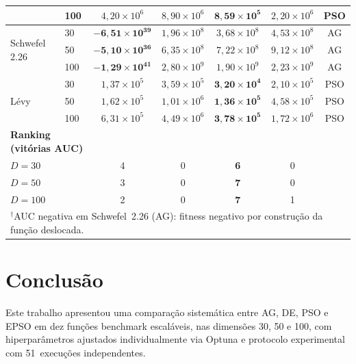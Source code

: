 \documentclass[runningheads]{llncs}
\begin{document}
\begin{table}[H]
\begin{tabular}{llccccc}
  & 100 & $4{,}20{\times}10^{6}$ & $8{,}90{\times}10^{6}$ & \cellcolor{green!20}$\mathbf{8{,}59{\times}10^{5}}$ & $2{,}20{\times}10^{6}$ & PSO \\
\midrule
\multirow{3}{*}{Schwefel 2.26}
  & 30  & \cellcolor{green!20}$\mathbf{-6{,}51{\times}10^{39}}$ & $1{,}96{\times}10^{8}$ & $3{,}68{\times}10^{8}$ & $4{,}53{\times}10^{8}$ & AG \\
  & 50  & \cellcolor{green!20}$\mathbf{-5{,}10{\times}10^{36}}$ & $6{,}35{\times}10^{8}$ & $7{,}22{\times}10^{8}$ & $9{,}12{\times}10^{8}$ & AG \\
  & 100 & \cellcolor{green!20}$\mathbf{-1{,}29{\times}10^{41}}$ & $2{,}80{\times}10^{9}$ & $1{,}90{\times}10^{9}$ & $2{,}23{\times}10^{9}$ & AG \\
\midrule
\multirow{3}{*}{Lévy}
  & 30  & $1{,}37{\times}10^{5}$ & $3{,}59{\times}10^{5}$ & \cellcolor{green!20}$\mathbf{3{,}20{\times}10^{4}}$ & $2{,}10{\times}10^{5}$ & PSO \\
  & 50  & $1{,}62{\times}10^{5}$ & $1{,}01{\times}10^{6}$ & \cellcolor{green!20}$\mathbf{1{,}36{\times}10^{5}}$ & $4{,}58{\times}10^{5}$ & PSO \\
  & 100 & $6{,}31{\times}10^{5}$ & $4{,}49{\times}10^{6}$ & \cellcolor{green!20}$\mathbf{3{,}78{\times}10^{5}}$ & $1{,}72{\times}10^{6}$ & PSO \\
\midrule
\multicolumn{2}{l}{\textbf{Ranking (vitórias AUC)}} & & & & & \\
\multicolumn{2}{l}{$D=30$}  & 4 & 0 & \textbf{6} & 0 & \\
\multicolumn{2}{l}{$D=50$}  & 3 & 0 & \textbf{7} & 0 & \\
\multicolumn{2}{l}{$D=100$} & 2 & 0 & \textbf{7} & 1 & \\
\bottomrule
\multicolumn{7}{l}{\scriptsize $^\dagger$AUC negativa em Schwefel~2.26 (AG): fitness negativo
  por construção da função deslocada.}
\end{tabular}
\end{table}

\section{Conclus\~{a}o}
\label{sec:conclusao}

Este trabalho apresentou uma comparação sistemática entre AG, DE, PSO
e EPSO em dez funções benchmark escaláveis, nas dimensões 30, 50 e
100, com hiperparâmetros ajustados individualmente via Optuna e
protocolo experimental com 51~execuções independentes.
\end{document}
